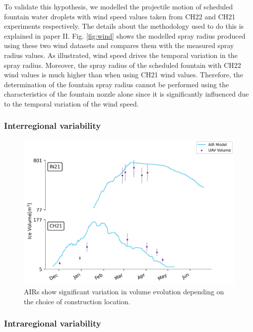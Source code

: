 To validate this hypothesis, we modelled the projectile motion of scheduled fountain water droplets with wind speed
values taken from CH22 and CH21 experiments respectively. The details about the methodology used to do this is
explained in paper II. Fig. \ref{fig:wind} shows the modelled spray radius produced using these
two wind datasets and compares them with the measured spray radius values. As illustrated, wind speed drives the
temporal variation in the spray radius. Moreover, the spray radius of the scheduled fountain with CH22 wind
values is much higher than when using CH21 wind values. Therefore, the determination of the fountain spray
radius cannot be performed using the characteristics of the fountain nozzle alone since it is significantly
influenced due to the temporal variation of the wind speed.

\subsubsection{Interregional variability}

\begin{figure}[t]
\centering
\includegraphics[width=12cm]{Figures/IN21vsCH21.jpg}
\caption{AIRs show significant variation in volume evolution depending on the choice of construction location.}
\label{fig:2AIRs}
\end{figure}

\subsubsection{Intraregional variability}

